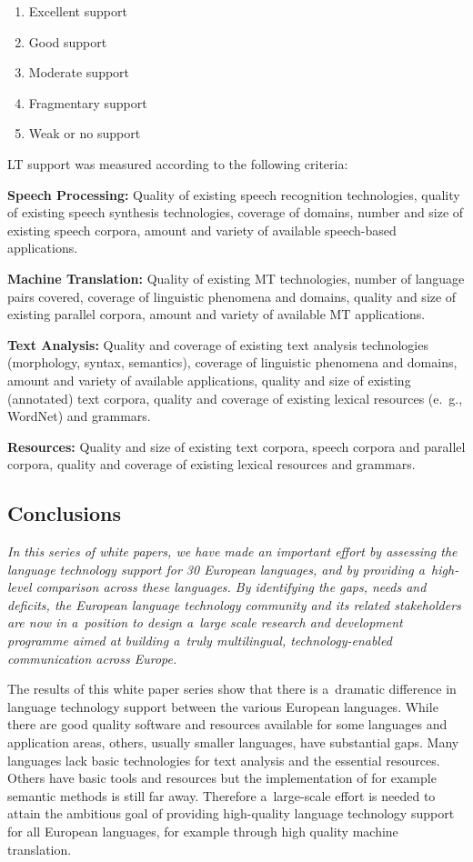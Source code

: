 \begin{multicols}{2}
\begin{enumerate} \item Excellent support \item Good support \item
Moderate support \item Fragmentary support \item Weak or no support
\end{enumerate} 

LT support was measured according to the following criteria: 

\textbf{Speech Processing:} Quality of existing speech recognition
technologies, quality of existing speech synthesis technologies,
coverage of domains, number and size of existing speech corpora,
amount and variety of available speech-based applications. 

\textbf{Machine Translation:} Quality of existing MT technologies,
number of language pairs covered, coverage of linguistic phenomena and
domains, quality and size of existing parallel corpora, amount and
variety of available MT applications. 

\textbf{Text Analysis:} Quality and coverage of existing text analysis
technologies (morphology, syntax, semantics), coverage of linguistic
phenomena and domains, amount and variety of available applications,
quality and size of existing (annotated) text corpora, quality and
coverage of existing lexical resources (e.\, g., WordNet) and
grammars. 

\textbf{Resources:} Quality and size of existing text corpora, speech
corpora and parallel corpora, quality and coverage of existing lexical
resources and grammars. 

\subsection{Conclusions} 

\emph{In this series of white papers, we have made an important effort
by assessing the language technology support for 30 European
languages, and by providing a~high-level comparison across these
languages. By identifying the gaps, needs and deficits, the European
language technology community and its related stakeholders are now in
a~position to design a~large scale research and development programme
aimed at building a~truly multilingual, technology-enabled
communication across Europe.} 

The results of this white paper series show that there is a~dramatic
difference in language technology support between the various European
languages. While there are good quality software and resources
available for some languages and application areas, others, usually
smaller languages, have substantial gaps. Many languages lack basic
technologies for text analysis and the essential resources. Others
have basic tools and resources but the implementation of for example
semantic methods is still far away. Therefore a~large-scale effort is
needed to attain the ambitious goal of providing high-quality language
technology support for all European languages, for example through
high quality machine translation. 


\end{multicols}

